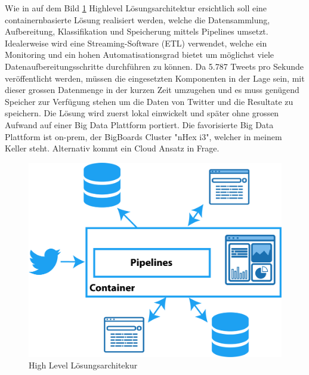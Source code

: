 Wie in auf dem Bild \ref{fig:high_level_architecure} Highlevel L{\"o}sungsarchitektur ersichtlich soll eine containernbasierte Lösung realisiert werden, welche die Datensammlung, Aufbereitung, Klassifikation und Speicherung mittels Pipelines umsetzt. Idealerweise wird eine Streaming-Software (ETL) verwendet, welche ein Monitoring und ein hohen Automatisationsgrad bietet um möglichst viele Datenaufbereitungsschritte durchführen zu können. Da 5.787 Tweets pro Sekunde ver{\"o}ffentlicht werden, müssen die eingesetzten  Komponenten in der Lage sein, mit dieser grossen Datenmenge in der kurzen Zeit umzugehen und es muss  genügend Speicher zur Verfügung stehen um die Daten von Twitter und die Resultate zu speichern. Die L{\"o}sung wird zuerst lokal einwickelt und sp{\"a}ter ohne grossen Aufwand auf einer Big Data Plattform portiert. Die favorisierte Big Data Plattform ist on-prem, der BigBoards Cluster "nHex i3", welcher in meinem Keller steht. Alternativ kommt ein Cloud Ansatz in Frage. 

\begin{figure}[H]
	\centering
		\includegraphics[scale=0.4 ]{images/architecktur_high_level_ohne.png}
	\caption{High Level L{\"o}sungsarchitekur}
	\label{fig:high_level_architecure}
\end{figure}
